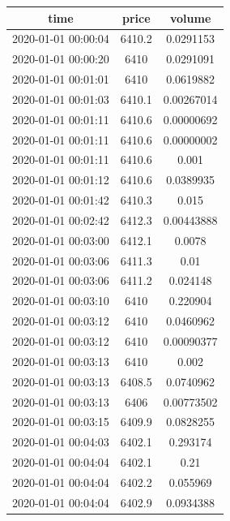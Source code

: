 \documentclass[a4paper,12pt]{report}
\begin{document}
\begin{fig}
	\begin{center}
		\begin{tabular}{||c c c||} 
			\hline
			time & price & volume \\ [0.5ex] 
			\hline\hline
			2020-01-01 00:00:04 & 6410.2 & 0.0291153 \\
						\hline
			2020-01-01 00:00:20 & 6410 & 0.0291091 \\
						\hline
			2020-01-01 00:01:01 & 6410 & 0.0619882 \\
						\hline
			2020-01-01 00:01:03 & 6410.1 & 0.00267014 \\
						\hline
			2020-01-01 00:01:11 & 6410.6 & 0.00000692 \\
						\hline
			2020-01-01 00:01:11 & 6410.6 & 0.00000002 \\
						\hline
			2020-01-01 00:01:11 & 6410.6 & 0.001 \\
						\hline
			2020-01-01 00:01:12 & 6410.6 & 0.0389935 \\
						\hline
			2020-01-01 00:01:42 & 6410.3 & 0.015 \\
						\hline
			2020-01-01 00:02:42 & 6412.3 & 0.00443888 \\
						\hline
			2020-01-01 00:03:00 & 6412.1 & 0.0078 \\
						\hline
			2020-01-01 00:03:06 & 6411.3 & 0.01\\
						\hline
			2020-01-01 00:03:06 & 6411.2 & 0.024148 \\
						\hline
			2020-01-01 00:03:10 & 6410 & 0.220904 \\
						\hline
			2020-01-01 00:03:12 & 6410 & 0.0460962\\ 
						\hline
			2020-01-01 00:03:12 & 6410 & 0.00090377\\
						\hline
			2020-01-01 00:03:13 & 6410 & 0.002 \\
						\hline
			2020-01-01 00:03:13 & 6408.5 & 0.0740962 \\
						\hline
			2020-01-01 00:03:13 & 6406 & 0.00773502 \\
						\hline
			2020-01-01 00:03:15 & 6409.9 & 0.0828255 \\
						\hline
			2020-01-01 00:04:03 & 6402.1 & 0.293174 \\
						\hline
			2020-01-01 00:04:04 & 6402.1 & 0.21 \\
						\hline
			2020-01-01 00:04:04 & 6402.2 & 0.055969 \\
						\hline
			2020-01-01 00:04:04 & 6402.9 & 0.0934388 \\

\end{tabular}
\end{center}
\end{fig}
\end{document}
